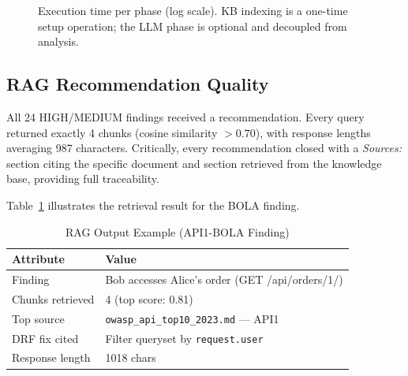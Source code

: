\documentclass[conference]{IEEEtran}
\begin{document}
\begin{figure}[htbp]
\centering
{}
\caption{Execution time per phase (log scale). KB indexing is a one-time
setup operation; the LLM phase is optional and decoupled from analysis.}
\label{fig:timing}
\end{figure}

\subsection{RAG Recommendation Quality}

All 24 HIGH/MEDIUM findings received a recommendation. Every query returned
exactly 4 chunks (cosine similarity $>0.70$), with response lengths averaging
987 characters. Critically, every recommendation closed with a
\textit{Sources:} section citing the specific document and section retrieved
from the knowledge base, providing full traceability.

Table~\ref{tab:rag_ex} illustrates the retrieval result for the BOLA finding.

\begin{table}[htbp]
\caption{RAG Output Example (API1-BOLA Finding)}
\label{tab:rag_ex}
\centering
\small
\begin{tabular}{@{}ll@{}}
\toprule
\textbf{Attribute} & \textbf{Value} \\
\midrule
Finding        & Bob accesses Alice's order (GET /api/orders/1/) \\
Chunks retrieved & 4 (top score: 0.81) \\
Top source     & \texttt{owasp\_api\_top10\_2023.md} — API1 \\
DRF fix cited  & Filter queryset by \texttt{request.user} \\
Response length & 1018 chars \\
\bottomrule
\end{tabular}
\end{table}
\end{document}
